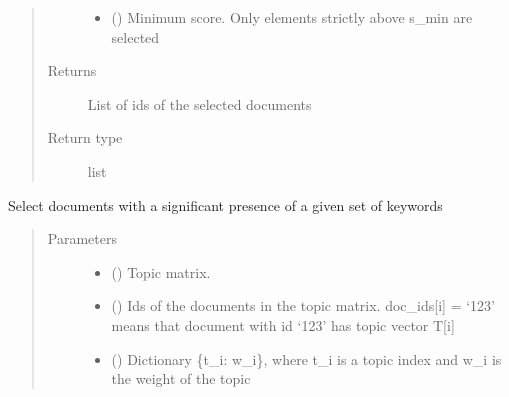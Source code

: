 \documentclass[letterpaper,10pt,english]{sphinxmanual}
\begin{document}
\begin{fulllineitems}
\begin{fulllineitems}
\begin{quote}
\begin{description}
\begin{itemize}
\item {} 
\sphinxAtStartPar
{} () \textendash{} Minimum score. Only elements strictly above s\_min are selected

\end{itemize}

\item[{Returns}] \leavevmode
\sphinxAtStartPar
{} \textendash{} List of ids of the selected documents

\item[{Return type}] \leavevmode
\sphinxAtStartPar
list

\end{description}\end{quote}

\end{fulllineitems}


\begin{fulllineitems}
\label{\detokenize{dc_preprocessor:src.domain_classifier.preprocessor.CorpusDFProcessor.filter_by_topics}}
\sphinxAtStartPar
Select documents with a significant presence of a given set of keywords
\begin{quote}\begin{description}
\item[{Parameters}] \leavevmode\begin{itemize}
\item {} 
\sphinxAtStartPar
{} () \textendash{} Topic matrix.

\item {} 
\sphinxAtStartPar
{} () \textendash{} Ids of the documents in the topic matrix. doc\_ids{[}i{]} = ‘123’ means
that document with id ‘123’ has topic vector T{[}i{]}

\item {} 
\sphinxAtStartPar
{} () \textendash{} Dictionary \{t\_i: w\_i\}, where t\_i is a topic index and w\_i is the
weight of the topic


\end{itemize}
\end{description}
\end{quote}
\end{fulllineitems}
\end{fulllineitems}
\end{document}
